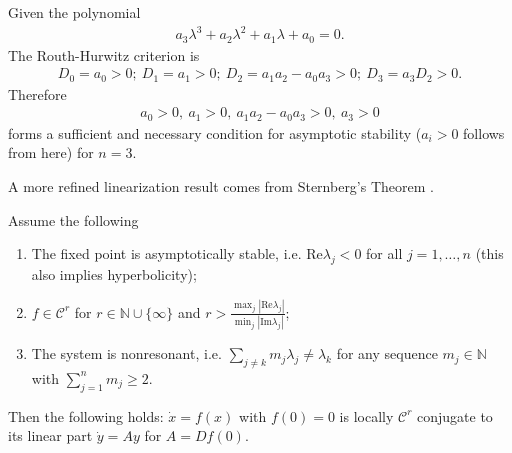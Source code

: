 \begin{ex}
	Given the polynomial
	\begin{align}
		a_3 \lambda ^3 + a_2 \lambda^2 + a_1 \lambda + a_0 = 0.
	\end{align}
	The Routh-Hurwitz criterion is
	\begin{align}
	D_0 = a_0 > 0;\ D_1 = a_1 >0;\ D_2 = a_1 a_2 - a_0 a_3>0;\ D_3 = a_3 D_2 >0.	
	\end{align}
	Therefore 
	\begin{align}
		\boxed{
			a_0> 0,\ a_1 > 0,\ a_1a_2 - a_0a_3 > 0,\ a_3 > 0
		}
	\end{align}
	forms a sufficient and necessary condition for asymptotic stability ($a_i >0$ follows from here) for $n=3$.
\end{ex}

A more refined linearization result comes from Sternberg's Theorem \cite{Chicone}.
\begin{theorem}[Sternberg]
Assume the following
\begin{enumerate}
	\item The fixed point is asymptotically stable, i.e. $ \textrm{Re} \lambda _j<0$ for all $j=1,\ldots,n$ (this also implies hyperbolicity);
	\item $f\in \mathcal{C}^{r}$ for $r\in \mathbb{N}\cup \{\infty \}$ and $r>\frac{\max_{j}| \textrm{Re} \lambda _j|}{\min_{j}| \textrm{Im} \lambda _j|}$;
	\item The system is nonresonant, i.e. $\sum_{j\neq k}^{}m_j \lambda _j \neq \lambda_k $ for any sequence $m_j \in \mathbb{N}$ with $\sum_{j=1}^{n} m_j \geq 2$.
	
\end{enumerate}
Then the following holds: $\dot{x}=f(x)$ with $f(0)=0$ is locally $\mathcal{C}^{r}$ conjugate to its linear part $\dot{y}=Ay$ for $A= Df(0)$.
\end{theorem}


